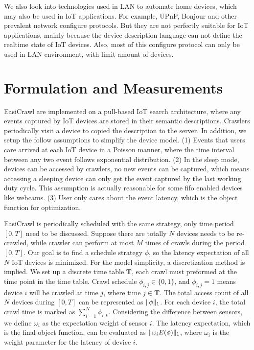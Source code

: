 \documentclass[conference]{IEEEtran}
\begin{document}
We also look into technologies used in LAN to automate home devices, which may also be used in IoT applications. For example, UPnP\cite{UPnP}, Bonjour\cite{Bonjour} and other prevalent network configure protocols. But they are not perfectly suitable for IoT applications, mainly because the device description language can not define the realtime state of IoT devices. Also, most of this configure protocol can only be used in LAN environment, with limit amount of devices.

\section{Formulation and Measurements}
EasiCrawl are implemented on a pull-based IoT search architecture, where any events captured by IoT devices are stored in their semantic descriptions. Crawlers periodically visit a device to copied the description to the server.
In addition, we setup the follow assumptions to simplify the device model. 
(1) Events that users care arrived at each IoT device in a Poisson manner, where the time interval between any two event follows exponential distribution. 
(2) In the sleep mode, devices can be accessed by crawlers, no new events can be captured, which means accessing a sleeping device can only get the event captured by the last working duty cycle. This assumption is actually reasonable for some fifo enabled devices like webcams. 
(3) User only cares about the event latency, which is the object function for optimization.


EasiCrawl is periodically scheduled with the same strategy, only time period $[0, T]$ need to be discussed.
Suppose there are totally $N$ devices needs to be re-crawled, while crawler can perform at most $M$ times of crawls during the period $[0, T]$. Our goal is to find a schedule strategy $\phi$, so the latency expectation of all $N$ IoT devices is minimized. 
For the model simplicity, a discretization method is implied. We set up a discrete time table $\mathbf{T}$, each crawl must preformed at the time point in the time table.
Crawl schedule $\phi_{i,j}\in\{0,1\}$, and $\phi_{i,j}=1$ means device $i$ will be crawled at time $j$, where time $j\in\mathbf{T}$.
The total access count of all $N$ devices during $[0, T]$ can be represented as $\Arrowvert\phi\Arrowvert_{1}$. For each device $i$, the total crawl time is marked as $\sum_{i=1}^{N}\phi_{i,k}$. 
Considering the difference between sensors, we define $\omega_i$ as the expectation weight of sensor $i$. The latency expectation, which is the final object function, can be evaluated as $\Arrowvert \omega_i E(\phi) \Arrowvert_{1}$, where $\omega_i$ is the weight parameter for the latency of device $i$.
\end{document}
